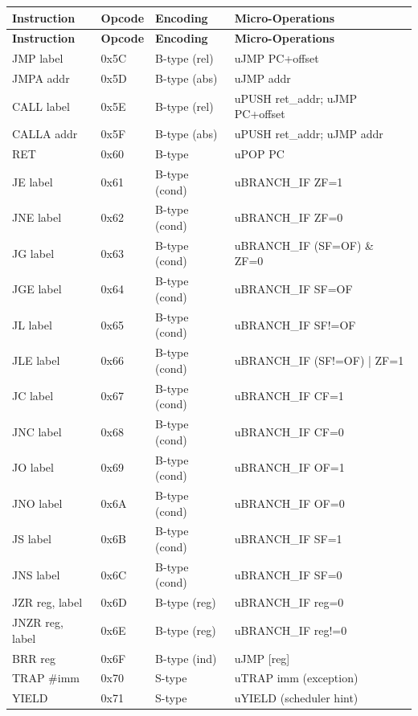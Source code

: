 \documentclass[12pt]{article}
\begin{document}
\begin{longtable}{@{}L{2.8cm}L{1.5cm}L{1.7cm}L{4.5cm}@{}}
\toprule
\textbf{Instruction} & \textbf{Opcode} & \textbf{Encoding} & \textbf{Micro-Operations} \\ \midrule
\endfirsthead
\toprule
\textbf{Instruction} & \textbf{Opcode} & \textbf{Encoding} & \textbf{Micro-Operations} \\ \midrule
\endhead
JMP label & 0x5C & B-type (rel) & uJMP PC+offset \\
JMPA addr & 0x5D & B-type (abs) & uJMP addr \\
CALL label & 0x5E & B-type (rel) & uPUSH ret\_addr; uJMP PC+offset \\
CALLA addr & 0x5F & B-type (abs) & uPUSH ret\_addr; uJMP addr \\
RET & 0x60 & B-type & uPOP PC \\
JE label & 0x61 & B-type (cond) & uBRANCH\_IF ZF=1 \\
JNE label & 0x62 & B-type (cond) & uBRANCH\_IF ZF=0 \\
JG label & 0x63 & B-type (cond) & uBRANCH\_IF (SF=OF) \& ZF=0 \\
JGE label & 0x64 & B-type (cond) & uBRANCH\_IF SF=OF \\
JL label & 0x65 & B-type (cond) & uBRANCH\_IF SF!=OF \\
JLE label & 0x66 & B-type (cond) & uBRANCH\_IF (SF!=OF) | ZF=1 \\
JC label & 0x67 & B-type (cond) & uBRANCH\_IF CF=1 \\
JNC label & 0x68 & B-type (cond) & uBRANCH\_IF CF=0 \\
JO label & 0x69 & B-type (cond) & uBRANCH\_IF OF=1 \\
JNO label & 0x6A & B-type (cond) & uBRANCH\_IF OF=0 \\
JS label & 0x6B & B-type (cond) & uBRANCH\_IF SF=1 \\
JNS label & 0x6C & B-type (cond) & uBRANCH\_IF SF=0 \\
JZR reg, label & 0x6D & B-type (reg) & uBRANCH\_IF reg=0 \\
JNZR reg, label & 0x6E & B-type (reg) & uBRANCH\_IF reg!=0 \\
BRR reg & 0x6F & B-type (ind) & uJMP [reg] \\
TRAP \#imm & 0x70 & S-type & uTRAP imm (exception) \\
YIELD & 0x71 & S-type & uYIELD (scheduler hint) \\ \bottomrule
\end{longtable}
\end{document}
